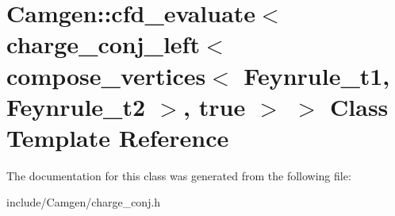 \hypertarget{a00039}{}\section{Camgen\+:\+:cfd\+\_\+evaluate$<$ charge\+\_\+conj\+\_\+left$<$ compose\+\_\+vertices$<$ Feynrule\+\_\+t1, Feynrule\+\_\+t2 $>$, true $>$ $>$ Class Template Reference}
\label{a00039}


The documentation for this class was generated from the following file\+:\begin{DoxyCompactItemize}
\item 
include/\+Camgen/charge\+\_\+conj.\+h\end{DoxyCompactItemize}
